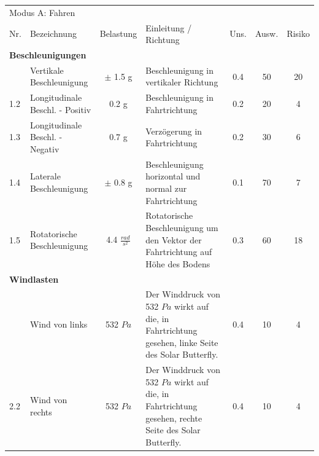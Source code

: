 \begin{landscape}%
  \centering %
  \begin{tabularx}{\linewidth}{llcXccc}
    \multicolumn{7}{l}{\LARGE{Modus A: Fahren}}\\
    \thickhline
    Nr. & Bezeichnung & Belastung & Einleitung / Richtung & Uns. & Ausw. & Risiko\\
    \hline
    \multicolumn{7}{l}{\textbf{Beschleunigungen}}\\
    \thickhline
    1.1 & Vertikale Beschleunigung         & $\pm$ 1.5 g           & Beschleunigung in vertikaler Richtung & 0.4 & 50 & 20\\
    1.2 & Longitudinale Beschl. - Positiv  & 0.2 g                 & Beschleunigung in Fahrtrichtung & 0.2 & 20 & 4\\
    1.3 & Longitudinale Beschl. - Negativ  & 0.7 g                 & Verzögerung in Fahrtrichtung & 0.2 & 30 & 6\\
    1.4 & Laterale Beschleunigung          & $\pm$ 0.8 g           & Beschleunigung horizontal und normal zur Fahrtrichtung & 0.1 & 70 & 7\\
    1.5 & Rotatorische Beschleunigung      & 4.4 $\frac{rad}{s^2}$ & Rotatorische Beschleunigung um den Vektor der Fahrtrichtung auf Höhe des Bodens & 0.3 & 60 & 18\\

    \multicolumn{7}{l}{\textbf{Windlasten}}\\
    \thickhline
    2.1 & Wind von links & 532 $Pa$ & Der Winddruck von 532 $Pa$ wirkt auf die, in Fahrtrichtung gesehen, linke Seite des Solar Butterfly. %
    & 0.4 & 10 & 4\\
    2.2 & Wind von rechts & 532 $Pa$ & Der Winddruck von 532 $Pa$ wirkt auf die, in Fahrtrichtung gesehen, rechte Seite des Solar Butterfly. %
    & 0.4 & 10 & 4\\


\end{tabularx}
\end{landscape}
